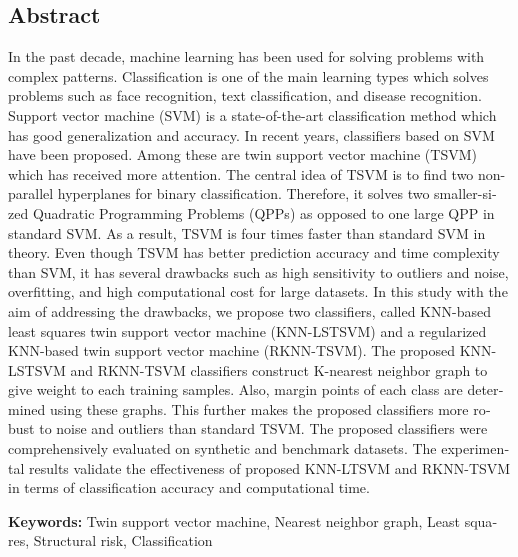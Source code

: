 \pagestyle{plain}

{}

\begin{latin}
	
\section*{Abstract}
In the past decade, machine learning has been used for solving problems with complex patterns. Classification is one of the main learning types which solves problems such as face recognition, text classification, and disease recognition. Support vector machine (SVM) is a state-of-the-art classification method which has good generalization and accuracy. In recent years, classifiers based on SVM have been proposed. Among these are twin support vector machine (TSVM) which has received more attention. The central idea of TSVM is to find two non-parallel hyperplanes for binary classification. Therefore, it solves two smaller-sized Quadratic Programming Problems (QPPs) as opposed to one large QPP in standard SVM. As a result, TSVM is four times faster than standard SVM in theory. Even though TSVM has better prediction accuracy and time complexity than SVM, it has several drawbacks such as high sensitivity to outliers and noise, overfitting, and high computational cost for large datasets. In this study with the aim of addressing the drawbacks, we propose two classifiers, called KNN-based least squares twin support vector machine (KNN-LSTSVM) and a regularized KNN-based twin support vector machine (RKNN-TSVM). The proposed KNN-LSTSVM and RKNN-TSVM classifiers construct K-nearest neighbor graph to give weight to each training samples. Also, margin points of each class are determined using these graphs. This further makes the proposed classifiers more robust to noise and outliers than standard TSVM. The proposed classifiers were comprehensively evaluated on synthetic and benchmark datasets. The experimental results validate the effectiveness of proposed KNN-LTSVM and RKNN-TSVM in terms of classification accuracy and computational time.
	
\vspace{2cm}
\noindent \textbf{Keywords:}
Twin support vector machine, Nearest neighbor graph, Least squares, Structural risk, Classification 
	
\end{latin}
